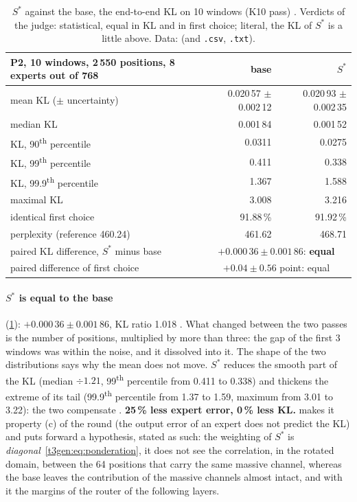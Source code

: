 \begin{table}[tbp]
\centering\small
\begin{tabular}{l r r}
\toprule
P2, 10 windows, 2\,550 positions, 8 experts out of 768 & base & $S^{*}$ \\
\midrule
mean KL ($\pm$ uncertainty) & 0.020\,57 $\pm$ 0.002\,12 & 0.020\,93 $\pm$ 0.002\,35 \\
median KL & 0.001\,84 & 0.001\,52 \\
KL, 90\textsuperscript{th} percentile & 0.0311 & 0.0275 \\
KL, 99\textsuperscript{th} percentile & 0.411 & 0.338 \\
KL, 99.9\textsuperscript{th} percentile & 1.367 & 1.588 \\
maximal KL & 3.008 & 3.216 \\
identical first choice & 91.88\,\% & 91.92\,\% \\
perplexity (reference 460.24) & 461.62 & 468.71 \\
\midrule
paired KL difference, $S^{*}$ minus base & \multicolumn{2}{c}{$+0.000\,36 \pm 0.001\,86$: \textbf{equal}} \\
paired difference of first choice & \multicolumn{2}{c}{$+0.04 \pm 0.56$ point: equal} \\
\bottomrule
\end{tabular}
\caption[$S^{*}$ against the base, the KL on ten windows]{$S^{*}$ against the base, the end-to-end KL on 10 windows (K10 pass) \mes. Verdicts of the judge: statistical, equal in KL and in first choice; literal, the KL of $S^{*}$ is a little above. Data:  (and \texttt{.csv}, \texttt{.txt}).}
\label{t3gen:tab:k10}
\end{table}

\paragraph{$S^{*}$ is equal to the base} (\cref{t3gen:tab:k10}): $+0.000\,36 \pm 0.001\,86$, KL ratio 1.018 \calc. What changed between the two passes is the number of positions, multiplied by more than three: the gap of the first 3 windows was within the noise, and it dissolved into it. The shape of the two distributions says why the mean does not move. $S^{*}$ reduces the smooth part of the KL (median $\div 1.21$, 99\textsuperscript{th} percentile from 0.411 to 0.338) and thickens the extreme of its tail (99.9\textsuperscript{th} percentile from 1.37 to 1.59, maximum from 3.01 to 3.22): the two compensate \mes. \textbf{25\,\% less expert error, 0\,\% less KL.}  makes it property (c) of the round (the output error of an expert does not predict the KL) and puts forward a hypothesis, stated as such: the weighting of $S^{*}$ is \emph{diagonal}~\eqref{t3gen:eq:ponderation}, it does not see the correlation, in the rotated domain, between the 64 positions that carry the same massive channel, whereas the base leaves the contribution of the massive channels almost intact, and with it the margins of the router of the following layers.

